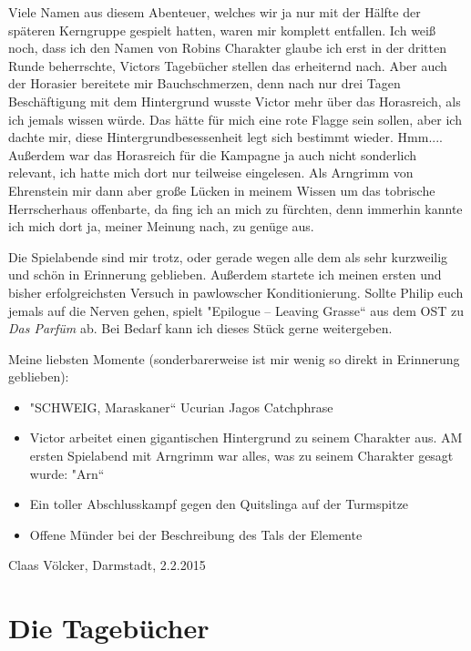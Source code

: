 \documentclass[11pt]{scrreprt}
\begin{document}
Viele Namen aus diesem Abenteuer, welches wir ja nur mit der Hälfte der späteren Kerngruppe gespielt hatten, waren mir komplett entfallen. Ich weiß noch, dass ich den Namen von Robins Charakter glaube ich erst in der dritten Runde beherrschte, Victors Tagebücher stellen das erheiternd nach. Aber auch der Horasier bereitete mir Bauchschmerzen, denn nach nur drei Tagen Beschäftigung mit dem Hintergrund wusste Victor mehr über das Horasreich, als ich jemals wissen würde. Das hätte für mich eine rote Flagge sein sollen, aber ich dachte mir, diese Hintergrundbesessenheit legt sich bestimmt wieder. Hmm.... Außerdem war das Horasreich für die Kampagne ja auch nicht sonderlich relevant, ich hatte mich dort nur teilweise eingelesen. Als Arngrimm von Ehrenstein mir dann aber große Lücken in meinem Wissen um das tobrische Herrscherhaus offenbarte, da fing ich an mich zu fürchten, denn immerhin kannte ich mich dort ja, meiner Meinung nach, zu genüge aus.\par
Die Spielabende sind mir trotz, oder gerade wegen alle dem als sehr kurzweilig und schön in Erinnerung geblieben. Außerdem startete ich meinen ersten und bisher erfolgreichsten Versuch in pawlowscher Konditionierung. Sollte Philip euch jemals auf die Nerven gehen, spielt "Epilogue – Leaving Grasse“ aus dem OST zu \emph{Das Parfüm} ab. Bei Bedarf kann ich dieses Stück gerne weitergeben.\par

Meine liebsten Momente (sonderbarerweise ist mir wenig so direkt in Erinnerung geblieben):\par

\begin{itemize}
\item "SCHWEIG, Maraskaner“ Ucurian Jagos Catchphrase
\item Victor arbeitet einen gigantischen Hintergrund zu seinem Charakter aus. AM ersten Spielabend mit Arngrimm war alles, was zu seinem Charakter  gesagt wurde: "Arn“
\item Ein toller Abschlusskampf gegen den Quitslinga auf der Turmspitze
\item Offene Münder bei der Beschreibung des Tals der Elemente
\end{itemize}

\begin{flushright}
Claas Völcker, Darmstadt, 2.2.2015
\end{flushright}



\section{Die Tagebücher}
\end{document}
